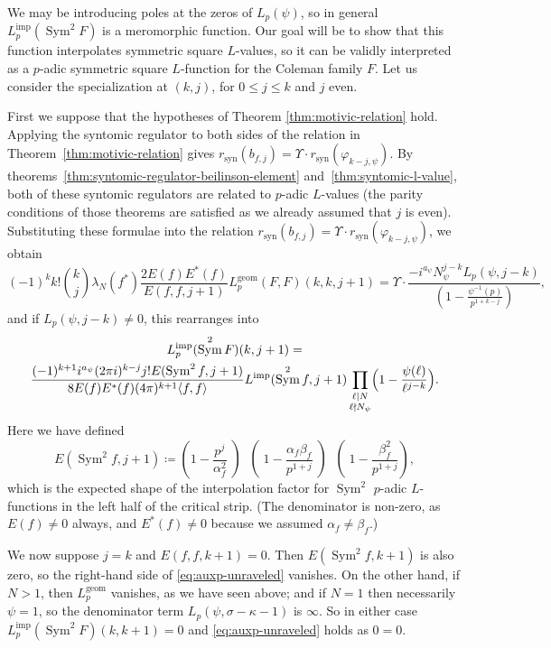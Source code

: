 \documentclass[11pt, a4paper, reqno]{amsart}
\theoremstyle{definition}
\theoremstyle{plain}
\theoremstyle{remark}
\DeclareMathOperator{\Sym}{Sym}
\DeclareMathOperator{\syn}{syn}
\renewcommand{\phi}{\varphi}
\newcommand{\regulator}[1]{r_{#1}}
\newcommand{\rsyn}{\regulator{\syn}}
\newcommand{\Lgeom}{L_p^{\mathrm{geom}}}
\newcommand{\Limp}{L^{\mathrm{imp}}}
\renewcommand{\le}{\leqslant}
\begin{document}
  We may be introducing poles at the zeros of $L_p(\psi)$, so in general $\Limp_p(\Sym^2 F)$ is a meromorphic function. Our goal will be to show that this function interpolates symmetric square $L$-values, so it can be validly interpreted as a $p$-adic symmetric square $L$-function for the Coleman family $F$. Let us consider the specialization at $(k, j)$, for $0 \le j \le k$ and $j$ even.

  First we suppose that the hypotheses of Theorem \ref{thm:motivic-relation} hold. Applying the syntomic regulator to both sides of the relation in Theorem~\ref{thm:motivic-relation} gives $\rsyn(b_{f, j}) = \Upsilon\cdot \rsyn(\phi_{k-j, \psi})$. By theorems~\ref{thm:syntomic-regulator-beilinson-element} and~\ref{thm:syntomic-l-value}, both of these syntomic regulators are related to $p$-adic $L$-values (the parity conditions of those theorems are satisfied as we already assumed that $j$ is even). Substituting these formulae into the relation $\rsyn(b_{f, j}) = \Upsilon \cdot \rsyn(\phi_{k-j, \psi})$, we obtain
  \[
   (-1)^k k! \binom{k}{j} \lambda_N(f^*) \frac{2 E(f) E^*(f)}{E(f, f, j + 1)} L_p^{\mathrm{geom}}(F, F)(k, k, j + 1) = \Upsilon \cdot \frac{-i^{a_\psi} N_\psi^{j-k} L_p(\psi, j - k)}{\left(1 - \tfrac{\psi^{-1}(p)}{p^{1 + k - j}}\right)},
  \]
  and if $L_p(\psi, j - k) \ne 0$, this rearranges into
  \begin{multline}
   \label{eq:auxp-unraveled}
   L_p^{\mathrm{imp}}(\Sym^2 F)(k, j + 1) = 
   \\ 
   \frac{(-1)^{k + 1}i^{a_\psi} (2 \pi i)^{k - j} j! E(\Sym^2 f, j + 1)}{8 E(f)E^*(f) (4\pi)^{k+1} \langle f, f \rangle} \Limp(\Sym^2 f,j+1)\prod_{\substack{\ell \mid N \\ \ell \nmid N_{\psi}}} \Bigl(1 - \frac{\psi(\ell)}{\ell^{j-k}}\Bigr).
  \end{multline}
  Here we have defined 
  \[ E(\Sym^2 f, j + 1) \coloneqq \left(1 - \frac{p^j}{\alpha_f^2}\middle) \middle(1 - \frac{\alpha_f\beta_f}{p^{1 + j}}\middle) \middle(1 - \frac{\beta_f^2}{p^{1 + j}}\right), \]
  which is the expected shape of the interpolation factor for $\Sym^2$ $p$-adic $L$-functions in the left half of the critical strip. (The denominator is non-zero, as $E(f)\neq 0$ always, and $E^*(f)\neq 0$ because we assumed $\alpha_f\neq\beta_f$.)
  
  We now suppose $j = k$ and $E(f, f, k+1) = 0$. Then $E(\Sym^2 f, k + 1)$ is also zero, so the right-hand side of \eqref{eq:auxp-unraveled} vanishes. On the other hand, if $N > 1$, then $\Lgeom$ vanishes, as we have seen above; and if $N = 1$ then necessarily $\psi = 1$, so the denominator term $L_p(\psi, \sigma - \kappa - 1)$ is $\infty$. So in either case $\Limp_p(\Sym^2 F)(k, k+1) = 0$ and \eqref{eq:auxp-unraveled} holds as $0 = 0$.
\end{document}
